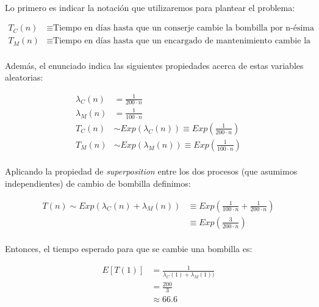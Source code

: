 \documentclass[a4paper, spanish]{article}
\begin{document}
  \paragraph{}
  Lo primero es indicar la notación que utilizaremos para plantear el problema:

  \begin{align*}
    T_C(n) &\equiv \text{Tiempo en días hasta que un conserje cambie la bombilla por n-ésima vez.} \\
    T_M(n) &\equiv \text{Tiempo en días hasta que un encargado de mantenimiento cambie la bombilla por n-ésima vez.}
  \end{align*}

  \paragraph{}
  Además, el enunciado indica las siguientes propiedades acerca de estas variables aleatorias:

  \begin{align*}
    \lambda_C(n) &= \frac{1}{200 \cdot n} \\
    \lambda_M(n) &= \frac{1}{100 \cdot n} \\
    T_C(n) &\sim Exp(\lambda_C(n)) \equiv Exp\left(\frac{1}{200 \cdot n}\right) \\
    T_M(n) &\sim Exp(\lambda_M(n)) \equiv Exp\left(\frac{1}{100 \cdot n}\right)
  \end{align*}

  \paragraph{}
  Aplicando la propiedad de \emph{superposition} entre los dos procesos (que asumimos independientes) de cambio de bombilla definimos:

  \begin{align*}
    T(n) \sim Exp(\lambda_C(n) + \lambda_M(n))
    &\equiv Exp\left(\frac{1}{100 \cdot n} +\frac{1}{200 \cdot n} \right) \\
    &\equiv Exp\left(\frac{3}{200 \cdot n}\right)
  \end{align*}

  \paragraph{}
  Entonces, el tiempo esperado para que se cambie una bombilla es:

  \begin{align*}
    E[T(1)]
    &= \frac{1}{\lambda_C(1) + \lambda_M(1))} \\
    &= \frac{200}{3} \\
    &\approx 66. 6
  \end{align*}
\end{document}
